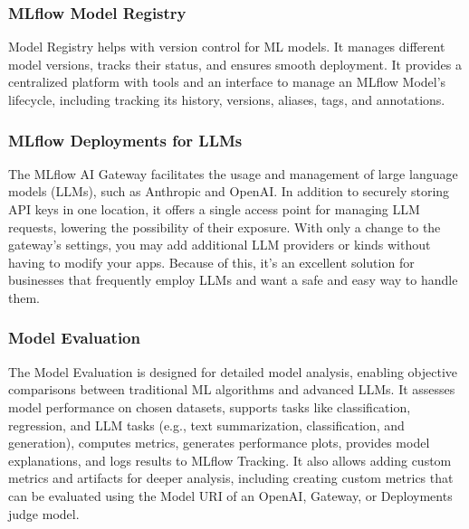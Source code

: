         \subsubsection{MLflow Model Registry}
        Model Registry helps with version control for ML models. It manages different model versions, tracks their status, and ensures smooth deployment. It provides a centralized platform with tools and an interface to manage an MLflow Model's lifecycle, including tracking its history, versions, aliases, tags, and annotations.
        \subsubsection{MLflow Deployments for LLMs}
        The MLflow AI Gateway facilitates the usage and management of large language models (LLMs), such as Anthropic and OpenAI.  In addition to securely storing API keys in one location, it offers a single access point for managing LLM requests, lowering the possibility of their exposure.  With only a change to the gateway's settings, you may add additional LLM providers or kinds without having to modify your apps.  Because of this, it's an excellent solution for businesses that frequently employ LLMs and want a safe and easy way to handle them.
\pagebreak
        \subsubsection{Model Evaluation}
        The Model Evaluation is designed for detailed model analysis, enabling objective comparisons between traditional ML algorithms and advanced LLMs. It assesses model performance on chosen datasets, supports tasks like classification, regression, and LLM tasks (e.g., text summarization, classification, and generation), computes metrics, generates performance plots, provides model explanations, and logs results to MLflow Tracking. It also allows adding custom metrics and artifacts for deeper analysis, including creating custom metrics that can be evaluated using the Model URI of an OpenAI, Gateway, or Deployments judge model.
